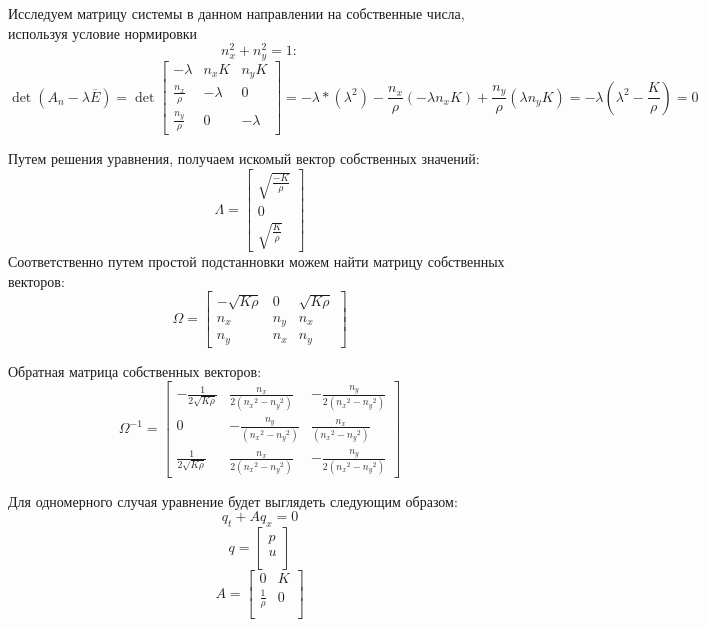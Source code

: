 \documentclass{article}
\begin{document}
Исследуем матрицу системы в данном направлении на собственные числа, используя условие нормировки \begin{equation}  n_x^2 + n_y^2 = 1: \end{equation}
\begin{equation}
\label{eq_five}
\det(A_n - \lambda \overline{E}) = \det\left[\begin{array}{crl}
-\lambda & n_x K & n_y K \\
\frac{n_x}{\rho} & -\lambda & 0\\
\frac{n_y}{\rho} & 0 & -\lambda
\end{array}\right] = - \lambda *(\lambda^2) - \frac{n_x}{\rho}(-\lambda n_x K) + \frac{n_y}{\rho}(\lambda n_y K) =
-\lambda(\lambda^2 - \frac{K}{\rho}) = 0 
\end{equation}

Путем решения уравнения, получаем искомый вектор собственных значений:
\begin{equation}
\label{eq_six}
\Lambda = \left[\begin{array}{crl}
\sqrt{\frac{-K}{\rho}}\\
0 \\
\sqrt{\frac{K}{\rho}}
\end{array}\right] 
\end{equation}
Соответственно путем простой подстанновки можем найти матрицу собственных векторов:
\begin{equation}
\label{eq_7}
\Omega = \left[\begin{array}{crl}
-\sqrt{K \rho} & 0 & \sqrt{K \rho} \\
n_x & n_y & n_x \\
n_y & n_x & n_y
\end{array}\right]
\end{equation}

Обратная матрица собственных векторов:
\begin{equation}
\Omega^{-1} = \left[\begin{array}{crl}
-\frac{1}{2 \sqrt{K \rho}} & \frac{n_x}{2({n_x}^2 - {n_y}^2)} & -\frac{n_y}{2({n_x}^2 - {n_y}^2)} \\
0 & -\frac{n_y}{({n_x}^2 - {n_y}^2)} & \frac{n_x}{({n_x}^2 - {n_y}^2)}\\
\frac{1}{2 \sqrt{K \rho}} & \frac{n_x}{2({n_x}^2 - {n_y}^2)} & -\frac{n_y}{2({n_x}^2 - {n_y}^2)}
\end{array}\right] 
\end{equation}

Для одномерного случая уравнение будет выглядеть следующим образом:
\begin{equation}\label{1D_equs}
q_t + A q_x  = 0
\end{equation}
$$q = \left[\begin{array}{cr}
p \\
u \\
\end{array}\right] $$
$$A = \left[\begin{array}{cr}
0 & K \\
\frac{1}{\rho} & 0 \\
\end{array}\right] $$
\end{document}
